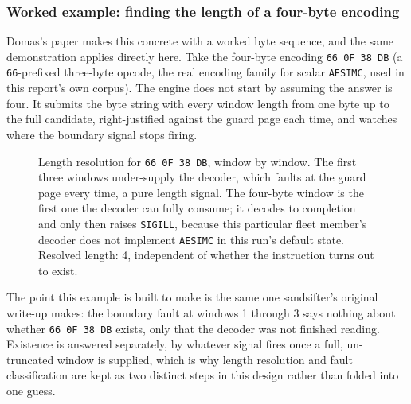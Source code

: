 \documentclass[11pt]{article}
\newcommand{\code}[1]{\texttt{#1}}
\begin{document}
\subsubsection{Worked example: finding the length of a four-byte encoding}

Domas's paper makes this concrete with a worked byte sequence, and the
same demonstration applies directly here. Take the four-byte encoding
\code{66 0F 38 DB} (a \code{66}-prefixed three-byte opcode, the real
encoding family for scalar \code{AESIMC}, used in this report's own
corpus). The engine does not start by assuming the answer is four. It
submits the byte string with every window length from one byte up to
the full candidate, right-justified against the guard page each time,
and watches where the boundary signal stops firing.

\begin{figure}[H]
\centering
{}
\caption{Length resolution for \code{66 0F 38 DB}, window by window. The
first three windows under-supply the decoder, which faults at the guard
page every time, a pure length signal. The four-byte window is the
first one the decoder can fully consume; it decodes to completion and
only then raises \code{SIGILL}, because this particular fleet member's
decoder does not implement \code{AESIMC} in this run's default state.
Resolved length: 4, independent of whether the instruction turns out to
exist.}
\label{fig:worked}
\end{figure}

The point this example is built to make is the same one sandsifter's
original write-up makes: the boundary fault at windows 1 through 3 says
nothing about whether \code{66 0F 38 DB} exists, only that the decoder
was not finished reading. Existence is answered separately, by whatever
signal fires once a full, un-truncated window is supplied, which is why
length resolution and fault classification are kept as two distinct
steps in this design rather than folded into one guess.
\end{document}
